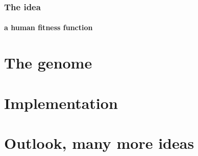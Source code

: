 \documentclass{beamer}
\begin{document}
\begin{frame}
	\frametitle{The idea}
	\framesubtitle{a human fitness function}
	
\end{frame}



\section{The genome} %
\label{sg:sec:the_genome}



\section{Implementation} %
\label{sg:sec:imple}




\section{Outlook, many more ideas} %
\label{sg:sec:outlook_many_more_ideas}


\end{document}
